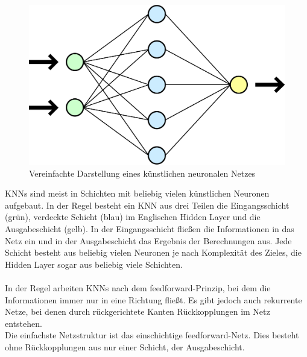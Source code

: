 \documentclass[12pt,oneside,a4paper,parskip]{scrbook}
\begin{document}
\begin{figure}[h]
	\begin{center}
		\includegraphics[width=12cm]{Bilder/Neurales_Netz.png}
		\caption{Vereinfachte Darstellung eines künstlichen neuronalen Netzes}
		\label{fig:wikiNeuronalesNetz}
	\end{center}
\end{figure}

KNNs sind meist in Schichten mit beliebig vielen künstlichen Neuronen aufgebaut. In der Regel besteht ein KNN aus drei Teilen die Eingangsschicht (grün), verdeckte Schicht (blau) im Englischen Hidden Layer und die Ausgabeschicht (gelb). In der Eingangsschicht fließen die Informationen in das Netz ein und in der Ausgabeschicht das Ergebnis der Berechnungen aus. Jede Schicht besteht aus beliebig vielen Neuronen je nach Komplexität des Zieles, die Hidden Layer sogar aus beliebig viele Schichten.
\\\\
In der Regel arbeiten KNNs nach dem feedforward-Prinzip, bei dem die Informationen immer nur in eine Richtung fließt. Es gibt jedoch auch rekurrente Netze, bei denen durch rückgerichtete Kanten Rückkopplungen im Netz entstehen. \\
Die einfachste Netzstruktur ist das einschichtige feedforward-Netz. Dies besteht ohne Rückkopplungen aus nur einer Schicht, der Ausgabeschicht.
\end{document}
